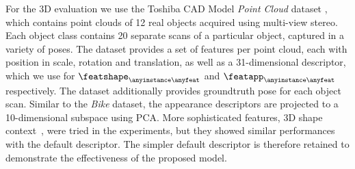 For the 3D evaluation we use the Toshiba CAD Model \emph{Point Cloud} dataset \cite{Ltd.2011}, which contains point clouds of 12 real objects acquired using multi-view stereo. Each object class contains 20 separate scans of a particular object, captured in a variety of poses. The dataset provides a set of features per point cloud, each with position in scale, rotation and translation, as well as a 31-dimensional descriptor, which we use for $\featshape_{\anyinstance\anyfeat}$ and $\featapp_{\anyinstance\anyfeat}$ respectively. The dataset additionally provides groundtruth pose for each object scan.
Similar to the \emph{Bike} dataset, the appearance descriptors are projected to a 10-dimensional subspace using PCA. More sophisticated features, \eg 3D shape context~\cite{Frome2004}, were tried in the experiments, but they showed similar performances with the default descriptor. The simpler default descriptor is therefore retained to demonstrate the effectiveness of the proposed model.


